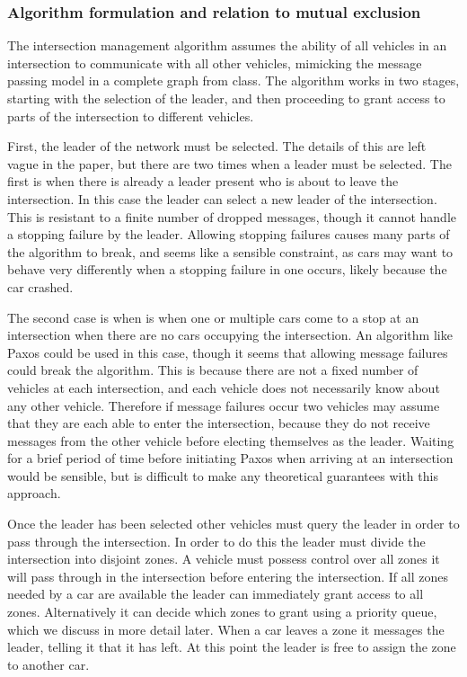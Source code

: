 \documentclass[12pt]{article}
\begin{document}
\subsubsection{Algorithm formulation and relation to mutual exclusion}
The intersection management algorithm assumes the ability of all vehicles in an intersection to communicate with all other vehicles, mimicking the message passing model in a complete graph from class. The algorithm works in two stages, starting with the selection of the leader, and then proceeding to grant access to parts of the intersection to different vehicles. \par
First, the leader of the network must be selected. The details of this are left vague in the paper, but there are two times when a leader must be selected. The first is when there is already a leader present who is about to leave the intersection. In this case the leader can select a new leader of the intersection. This is resistant to a finite number of dropped messages, though it cannot handle a stopping failure by the leader. Allowing stopping failures causes many parts of the algorithm to break, and seems like a sensible constraint, as cars may want to behave very differently when a stopping failure in one occurs, likely because the car crashed.\par
The second case is when is when one or multiple cars come to a stop at an intersection when there are no cars occupying the intersection. An algorithm like Paxos could be used in this case, though it seems that allowing message failures could break the algorithm. This is because there are not a fixed number of vehicles at each intersection, and each vehicle does not necessarily know about any other vehicle. Therefore if message failures occur two vehicles may assume that they are each able to enter the intersection, because they do not receive messages from the other vehicle before electing themselves as the leader. Waiting for a brief period of time before initiating Paxos when arriving at an intersection would be sensible, but is difficult to make any theoretical guarantees with this approach. \par
Once the leader has been selected other vehicles must query the leader in order to pass through the intersection. In order to do this the leader must divide the intersection into disjoint zones. A vehicle must possess control over all zones it will pass through in the intersection before entering the intersection. If all zones needed by a car are available the leader can immediately grant access to all zones. Alternatively it can decide which zones to grant using a priority queue, which we discuss in more detail later. When a car leaves a zone it messages the leader, telling it that it has left. At this point the leader is free to assign the zone to another car. \par
\end{document}
